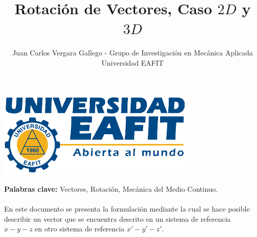 \documentclass[12pt,letterpaper]{article}
\author{Juan Carlos Vergara Gallego - Grupo de Investigación en Mecánica Aplicada \\ Universidad EAFIT}
\title{\textbf{Rotación de Vectores, Caso $2D$ y $3D$}}
\begin{document}
\pagestyle{fancyplain}
\fancyhf{}
\headheight=20pt %
\renewcommand{\headrulewidth}{0pt} %

\lhead %
{
\begin{minipage}{3cm}
\includegraphics[width=1.5 in]{img/logo.pdf}
\end{minipage}
}

\fancyfoot[c]{\thepage}

\maketitle


{\bf Palabras clave:} Vectores, Rotación, Mecánica del Medio Continuo.\\\\

\abstract
%
En este documento se presenta la formulación mediante la cual se hace posible describir un vector que se encuentra descrito en un sistema de referencia $x-y-z$ en otro sistema de referencia $x'-y'-z'$.
%
\end{document}
